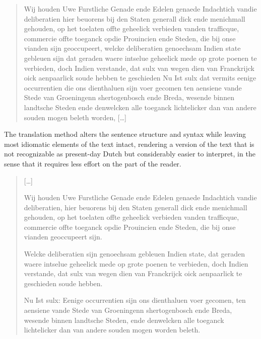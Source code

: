\begin{paper}
\begin{quote}
Wij houden Uwe Furstliche Genade ende Edelen genaede Indachtich vandie
deliberatien hier beuorens bij den Staten generall dick ende menichmall
gehouden, op het toelaten offte geheelick verbieden vanden trafficque,
commercie offte toeganck opdie Prouincien ende Steden, die bij onse
vianden sijn geoccupeert, welcke deliberatien genoechsam Indien state
gebleuen sijn dat geraden waere intselue geheelick mede op grote poenen
te verbieden, doch Indien verstande, dat sulx van wegen dien van
Franckrijck oick aenpaarlick soude hebben te geschieden Nu Ist sulx dat
vermits eenige occurrentien die ons dienthaluen sijn voer gecomen ten
aensiene vande Stede van Groeningenn shertogenbosch ende Breda, wesende
binnen landtsche Steden ende denwelcken alle toeganck lichtelicker dan
van andere souden mogen beleth worden, {[}\ldots{}{]}
\begin{flushright}
\end{flushright}

\end{quote}

\noindent The translation method alters the sentence structure and syntax while
leaving most idiomatic elements of the text intact, rendering a version
of the text that is not recognizable as present-day Dutch but
considerably easier to interpret, in the sense that it requires less
effort on the part of the reader.

\begin{quote}
{[}\ldots{}{]}

Wij houden Uwe Furstliche Genade ende Edelen genaede Indachtich vandie
deliberatien, hier beuorens bij den Staten generall dick ende menichmall
gehouden, op het toelaten offte geheelick verbieden vanden trafficque,
commercie offte toeganck opdie Prouincien ende Steden, die bij onse
vianden geoccupeert sijn.

Welcke deliberatien sijn genoechsam gebleuen Indien state, dat geraden
waere intselue geheelick mede op grote poenen te verbieden, doch Indien
verstande, dat sulx van wegen dien van Franckrijck oick aenpaarlick te
geschieden soude hebben.

Nu Ist sulx: Eenige occurrentien sijn ons dienthaluen voer gecomen, ten
aensiene vande Stede van Groeningenn shertogenbosch ende Breda, wesende
binnen landtsche Steden, ende denwelcken alle toeganck lichtelicker dan
van andere souden mogen worden beleth.
\end{quote}


\end{paper}
